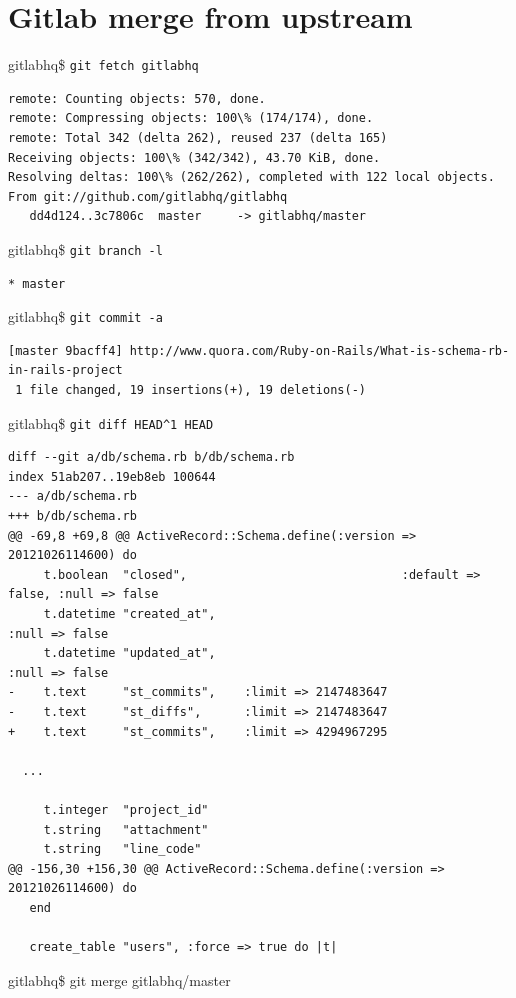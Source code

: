 \documentclass[times, utf8, seminar]{fit}
\begin{document}
\chapter{Gitlab merge from upstream}

\setlength{\parindent 0cm}
gitlabhq\$ \verb+git fetch gitlabhq+
\begin{lstlisting}
remote: Counting objects: 570, done.
remote: Compressing objects: 100\% (174/174), done.
remote: Total 342 (delta 262), reused 237 (delta 165)
Receiving objects: 100\% (342/342), 43.70 KiB, done.
Resolving deltas: 100\% (262/262), completed with 122 local objects.
From git://github.com/gitlabhq/gitlabhq
   dd4d124..3c7806c  master     -> gitlabhq/master
\end{lstlisting}


gitlabhq\$ \verb+git branch -l+
\begin{lstlisting}
* master
\end{lstlisting}


gitlabhq\$ \verb+git commit -a+
\begin{lstlisting}
[master 9bacff4] http://www.quora.com/Ruby-on-Rails/What-is-schema-rb-in-rails-project
 1 file changed, 19 insertions(+), 19 deletions(-)
\end{lstlisting}


gitlabhq\$ \verb+git diff HEAD^1 HEAD+
\begin{lstlisting}
diff --git a/db/schema.rb b/db/schema.rb
index 51ab207..19eb8eb 100644
--- a/db/schema.rb
+++ b/db/schema.rb
@@ -69,8 +69,8 @@ ActiveRecord::Schema.define(:version => 20121026114600) do
     t.boolean  "closed",                              :default => false, :null => false
     t.datetime "created_at",                                             :null => false
     t.datetime "updated_at",                                             :null => false
-    t.text     "st_commits",    :limit => 2147483647
-    t.text     "st_diffs",      :limit => 2147483647
+    t.text     "st_commits",    :limit => 4294967295

  ...

     t.integer  "project_id"
     t.string   "attachment"
     t.string   "line_code"
@@ -156,30 +156,30 @@ ActiveRecord::Schema.define(:version => 20121026114600) do
   end
 
   create_table "users", :force => true do |t|
\end{lstlisting}


gitlabhq\$ git merge gitlabhq/master
\end{document}

